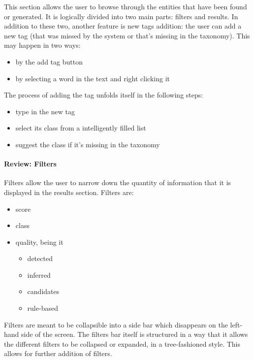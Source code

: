 \documentclass[12pt,oneside,svgnames]{memoir}
\begin{document}
This section allows the user to browse through the entities that have
been found or generated. It is logically divided into two main parts:
filters and results. In addition to these two, another feature is new
tags addition: the user can add a new tag (that was missed by the system
or that's missing in the taxonomy). This may happen in two ways:

\begin{itemize}
\itemsep1pt\parskip0pt
\item
  by the add tag button
\item
  by selecting a word in the text and right clicking it
\end{itemize}

The process of adding the tag unfolds itself in the following steps:

\begin{itemize}
\itemsep1pt\parskip0pt
\item
  type in the new tag
\item
  select its class from a intelligently filled list
\item
  suggest the class if it's missing in the taxonomy
\end{itemize}

\paragraph*{Review: Filters}\label{review-filters}

Filters allow the user to narrow down the quantity of information that
it is displayed in the results section. Filters are:

\begin{itemize}
\itemsep1pt\parskip0pt
\item
  score
\item
  class
\item
  quality, being it

  \begin{itemize}
  \itemsep1pt\parskip0pt
  \item
    detected
  \item
    inferred
  \item
    candidates
  \item
    rule-based
  \end{itemize}
\end{itemize}

Filters are meant to be collapsible into a side bar which disappears on
the left-hand side of the screen. The filters bar itself is structured
in a way that it allows the different filters to be collapsed or
expanded, in a tree-fashioned style. This allows for further addition of
filters.
\end{document}
